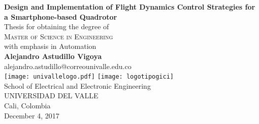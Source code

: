 \begin{titlepage}
\begin{center}
 {\LARGE\bfseries Design and Implementation of Flight Dynamics Control Strategies for a Smartphone-based Quadrotor\\}
 \vspace{2.5cm}
{Thesis for obtaining the degree of} \\[2cm]
\textsc{\Large{{Master of Science in Engineering}}} \\[5pt]
{\large  with emphasis in Automation} \\[2pt]
 \vfill
 \vspace{0.5cm}
 \vspace{1.5cm}
 {\Large\bfseries Alejandro Astudillo Vigoya}\\[5pt]
 alejandro.astudillo@correounivalle.edu.co\\[14pt]
 \vspace{1.5cm}
\texttt{[image: univallelogo.pdf]}
\texttt{[image: logotipogici]}
\\[35pt]
{School of Electrical and Electronic Engineering}\\[5pt]
{UNIVERSIDAD DEL VALLE}\\[5pt]
{Cali, Colombia}\\
 \vfill
 \vspace{0.5cm}
{December 4, 2017}

\end{center}
\end{titlepage}

\setcounter{page}{2} 

\newpage
\thispagestyle{empty}
\mbox{}


